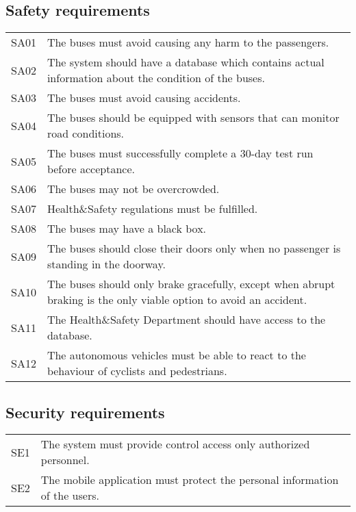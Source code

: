 \documentclass[a4paper]{article}
\begin{document}
\subsection{Safety requirements}
\begin{tabularx}{\textwidth}{p{.75cm} X}
        SA01 & The buses must avoid causing any harm to the passengers. \\
	SA02 & The system should have a database which contains actual
	       information about the condition of the buses. \\
        SA03 & The buses must avoid causing accidents. \\
	SA04 & The buses should be equipped with sensors that can monitor road
	       conditions. \\
	SA05 & The buses must successfully complete a 30-day test run before
	       acceptance. \\
        SA06 & The buses may not be overcrowded. \\
        SA07 & Health\&Safety regulations must be fulfilled. \\
        SA08 & The buses may have a black box. \\
	SA09 & The buses should close their doors only when no passenger is
	       standing in the doorway. \\
	SA10 & The buses should only brake gracefully, except when abrupt
	       braking is the only viable option to avoid an accident. \\
	SA11 & The Health\&Safety Department should have access to the database.
	       \\
	SA12 & The autonomous vehicles must be able to react to the behaviour of
	       cyclists and pedestrians. \\
\end{tabularx}


\subsection{Security requirements}
\begin{tabularx}{\textwidth}{p{.75cm} X}
	SE1 & The system must provide control access only authorized personnel.
	      \\
	SE2 & The mobile application must protect the personal information of
	      the users. \\
\end{tabularx}

\end{document}
